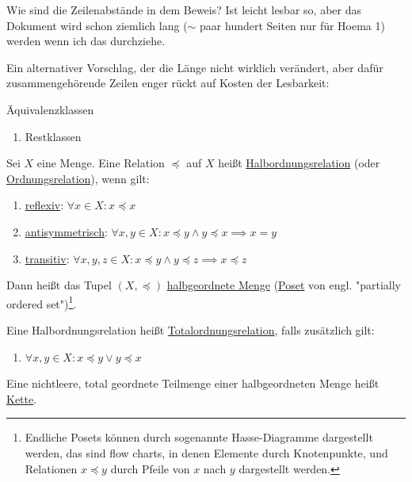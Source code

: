 \begin{query}
    Wie sind die Zeilenabstände in dem Beweis? Ist leicht lesbar so, aber das Dokument wird schon ziemlich lang ($\sim$ paar hundert Seiten nur für Hoema 1) werden wenn ich das durchziehe.

    Ein alternativer Vorschlag, der die Länge nicht wirklich verändert, aber dafür zusammengehörende Zeilen enger rückt auf Kosten der Lesbarkeit:
\end{query}

\begin{example}
    Äquivalenzklassen
    \begin{enumerate}
        \item Restklassen
    \end{enumerate}
\end{example}

\begin{definition}
    Sei $X$ eine Menge. Eine Relation $\preceq$ auf $X$ heißt \underline{Halbordnungsrelation} (oder \underline{Ordnungsrelation}), wenn gilt:
    \begin{enumerate}[label=(H\arabic*)]
        \item \underline{reflexiv}: $\forall x \in X: x \preceq x$
        \item \underline{antisymmetrisch}: $\forall x, y \in X: x \preceq y \land y \preceq x \implies x = y$
        \item \underline{transitiv}: $\forall x, y, z \in X: x \preceq y \land y \preceq z \implies x \preceq z$
    \end{enumerate}
    Dann heißt das Tupel $(X, \preceq)$ \underline{halbgeordnete Menge} (\underline{Poset} von engl. "partially ordered set")\footnote{Endliche Posets können durch sogenannte Hasse-Diagramme dargestellt werden, das sind flow charts, in denen Elemente durch Knotenpunkte, und Relationen $x \preceq y$ durch Pfeile von $x$ nach $y$ dargestellt werden.}.

    Eine Halbordnungsrelation heißt \underline{Totalordnungsrelation}, falls zusätzlich gilt:
    \begin{enumerate}[label=(T)]
        \item $\forall x, y \in X: x \preceq y \lor y \preceq x$
    \end{enumerate}
    Eine nichtleere, total geordnete Teilmenge einer halbgeordneten Menge heißt \underline{Kette}.
\end{definition}

